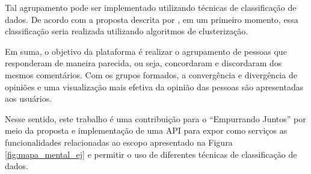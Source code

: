Tal agrupamento pode ser implementado utilizando técnicas de classificação de dados.
De acordo com a proposta descrita por , 
em um primeiro momento, essa classificação seria realizada utilizando algoritmos de clusterização. 

Em suma, o objetivo da plataforma é realizar o agrupamento de pessoas que responderam de maneira parecida, ou seja, 
concordaram e discordaram dos mesmos comentários. Com os grupos formados, a convergência e divergência 
de opiniões e uma visualização mais efetiva da opinião das pessoas são apresentadas aos usuários. 

Nesse sentido, este trabalho 
é uma contribuição para o ``Empurrando Juntos'' por meio da proposta e implementação de uma API para expor como serviços as funcionalidades
relacionadas ao escopo apresentado na Figura \ref{fig:mapa_mental_ej}  e permitir o uso de diferentes técnicas 
de classificação de dados.


